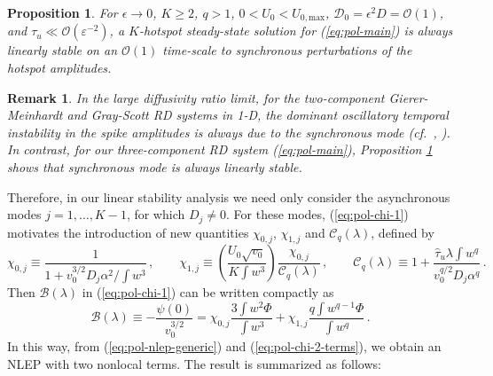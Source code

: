 \documentclass{article}%
\newtheorem{rem}[theorem]{Remark}
\newtheorem{prop}[theorem]{Proposition}
\newcommand{\eps}{{\displaystyle \varepsilon}}
\begin{document}
\begin{prop}\label{prop:sync} For $\epsilon\to 0$, $K\geq 2$, $q>1$, 
$0<U_0<U_{0,\textrm{max}}$, ${\mathcal D}_0=\epsilon^2 D = {\mathcal
    O}(1)$, and $\tau_u\ll {\mathcal O}(\eps^{-2})$, a $K$-hotspot
  steady-state solution for (\ref{eq:pol-main}) is always linearly
  stable on an ${\mathcal O}(1)$ time-scale to synchronous
  perturbations of the hotspot amplitudes.
\end{prop}

\begin{rem}\label{rd:sync} 
In the large diffusivity ratio limit, for the two-component
Gierer-Meinhardt and Gray-Scott RD systems in 1-D, the dominant
oscillatory temporal instability in the spike amplitudes is always due
to the synchronous mode (cf.~\cite{mjww_1}, \cite{kww_gs}). In
contrast, for our three-component RD system (\ref{eq:pol-main}),
Proposition \ref{prop:sync} shows that synchronous mode is always
linearly stable.
\end{rem}

Therefore, in our linear stability analysis we need only consider the
asynchronous modes $j=1,\ldots,K-1$, for which $D_j\neq 0$. For these
modes, (\ref{eq:pol-chi-1}) motivates the introduction
of new quantities $\chi_{0,j}$, $\chi_{1,j}$ and ${\mathcal
  C}_q(\lambda)$, defined by
\begin{equation}
\chi_{0,j}\equiv\frac{1}{1+v_{0}^{3/2}D_{j}\alpha^2/\int w^{3}}\,,\qquad
\chi_{1,j}\equiv \left( \frac{U_{0}\sqrt{v_{0}}}{K\int w^{3}}\right)
\frac{\chi_{0,j}}{\mathcal{C}_{q}(\lambda)}\,, \qquad
\mathcal{C}_{q}(\lambda)\equiv 1+\frac{\hat{\tau}_{u}\lambda \int w^q }
{v_{0}^{q/2}D_{j}\alpha^q } \,. \label{eq:pol-chi_0j1j-Cq}
\end{equation}
Then ${\mathcal B}(\lambda)$ in (\ref{eq:pol-chi-1}) can be written
compactly as
\begin{equation}
{\mathcal B}(\lambda)\equiv -\frac{\psi(0)}{v_0^{3/2}} =
\chi_{0,j}\frac{3\int w^{2}\Phi}{\int w^{3}}+
\chi_{1,j} \frac{q\int w^{q-1}\Phi}{\int w^{q}}\,.
\label{eq:pol-chi-2-terms}
\end{equation}
In this way, from (\ref{eq:pol-nlep-generic}) and
(\ref{eq:pol-chi-2-terms}), we obtain an NLEP with two nonlocal terms.
The result is summarized as follows:
\end{document}
